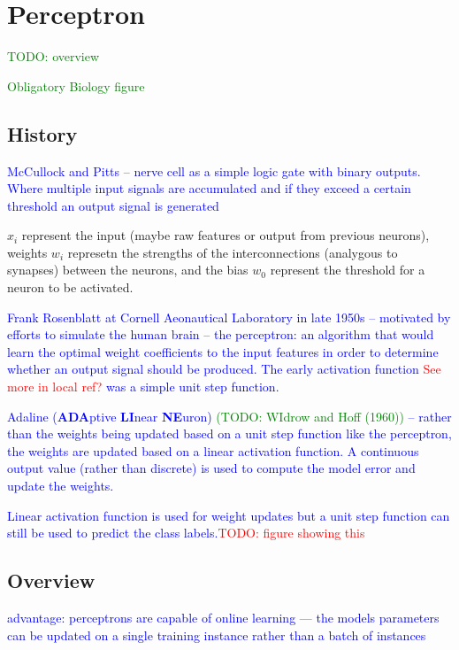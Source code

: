 \section{Perceptron}

\textcolor{green}{TODO: overview}

\textcolor{green}{Obligatory Biology figure}

\subsection{History}

\textcolor{blue}{McCullock and Pitts -- nerve cell as a simple logic gate with binary outputs.  Where multiple input signals are accumulated and if they exceed a certain threshold an output signal is generated}

\r{$x_i$ represent the input (maybe raw features or output from previous neurons), weights $w_i$ represetn the strengths of the interconnections (analygous to synapses) between the neurons, and the bias $w_0$ represent the threshold for a neuron to be activated.}

\textcolor{blue}{Frank Rosenblatt at Cornell Aeonautical Laboratory in late 1950s -- motivated by efforts to simulate the human brain -- the perceptron: an algorithm that would learn the optimal weight coefficients to the input features in order to determine whether an output signal should be produced. The early activation function \textcolor{red}{See more in local ref?} was a simple unit step function.}

\textcolor{blue}{Adaline (\textbf{ADA}ptive \textbf{LI}near \textbf{NE}uron) \textcolor{green}{(TODO: WIdrow and Hoff (1960))} -- rather than the weights being updated based on a unit step function like the perceptron, the weights are updated based on a linear activation function. A continuous output value (rather than discrete) is used to compute the model error and update the weights.}

\textcolor{blue}{Linear activation function is used for weight updates but a unit step function can still be used to predict the class labels.\textcolor{red}{TODO: figure showing this}}

\subsection{Overview}

\textcolor{blue}{advantage: perceptrons are capable of online learning --- the models parameters can be updated on a single training instance rather than a batch of instances}

